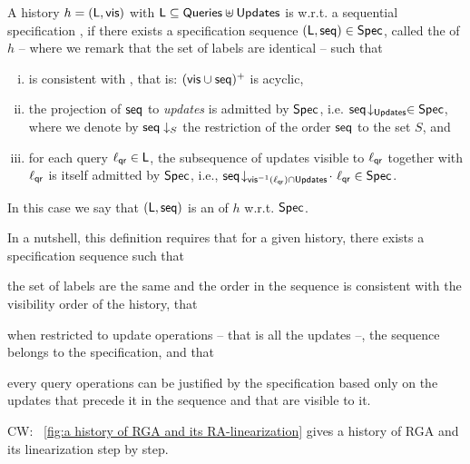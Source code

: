 \begin{definition}
  \label{definition:ralinearizability1} A history $h =
  (\mathsf{L},\mathsf{vis})$ with $\mathsf{L}\subseteq \mathsf{Queries}\uplus\mathsf{Updates}$ is \crdtlinearizable{} w.r.t. a
   sequential specification
  \Spec{}, if there exists a specification sequence
  $(\mathsf{L}, \mathsf{seq}) \in \mathsf{Spec}{}$, called the
  \emph{\crdtlinearization{}} of $h$ -- where we remark that the set of labels
  are identical -- such that %
  \begin{enumerate}[(i)]
  \item \aseqord{} is consistent with  \avisord{}, that is: $(\mathsf{vis}
    \cup \mathsf{seq})^{+}$ is acyclic,
  \item the projection of $\mathsf{seq}$ to \emph{updates} is
    admitted by $\mathsf{Spec}$, i.e.
    $\mathsf{seq}\!\downarrow_{\mathsf{Updates}} \in \mathsf{Spec}$, where we denote by
    $\mathsf{seq}\downarrow_{S}$ the restriction of the order $\mathsf{seq}$ to
    the set $S$, and
  \item\label{it:query} for each query $\ell_{\mathsf{qr}}\in \mathsf{L}$, the subsequence of updates visible to $\ell_{\mathsf{qr}}$ together with $\ell_{\mathsf{qr}}$ is itself admitted by $\mathsf{Spec}$, i.e., $\mathsf{seq}\!\downarrow_{\mathsf{vis}^{-1}(\ell_{\mathsf{qr}})\cap \mathsf{Updates}}\!\cdot\
    \ell_{\mathsf{qr}} \in \mathsf{Spec}$.
\end{enumerate}
In this case we say that $(\mathsf{L}, \mathsf{seq})$ is an \emph{\crdtlinearization{}} of $h$ w.r.t. $\mathsf{Spec}{}$.
\end{definition}

In a nutshell, this definition requires that for a given
history, there exists a specification sequence such
that
\begin{inparaenum}[(i)]
\item the set of labels are the same and the order in the sequence is
  consistent with the visibility order of the history, that
\item when restricted to update operations -- that is all the updates --, the sequence belongs to
  the specification, and that
\item every query operations can be justified by the specification based only
  on the updates that precede it in the sequence and that are visible
  to it.
\end{inparaenum}

 {\color {red}CW: \figurename~\ref{fig:a history of RGA and its RA-linearization} gives a history of RGA and its linearization step by step.}

